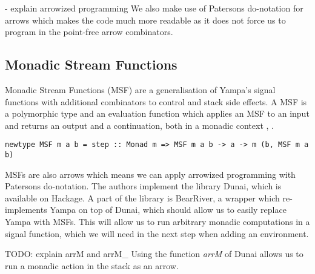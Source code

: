 - explain arrowized programming
We also make use of Patersons do-notation for arrows \cite{paterson_new_2001} which makes the code much more readable as it does not force us to program in the point-free arrow combinators. 

\subsection{Monadic Stream Functions}
Monadic Stream Functions (MSF) are a generalisation of Yampa's signal functions with additional combinators to control and stack side effects. A MSF is a polymorphic type and an evaluation function which applies an MSF to an input and returns an output and a continuation, both in a monadic context \cite{perez_functional_2016}, \cite{perez_extensible_2017}.
\begin{verbatim}
newtype MSF m a b = step :: Monad m => MSF m a b -> a -> m (b, MSF m a b)
\end{verbatim}

MSFs are also arrows which means we can apply arrowized programming with Patersons do-notation. The authors \cite{perez_functional_2016} implement the library Dunai, which is available on Hackage. A part of the library is BearRiver, a wrapper which re-implements Yampa on top of Dunai, which should allow us to easily replace Yampa with MSFs. This will allow us to run arbitrary monadic computations in a signal function, which we will need in the next step when adding an environment.

TODO: explain arrM and arrM\_
Using the function \textit{arrM} of Dunai allows us to run a monadic action in the stack as an arrow.